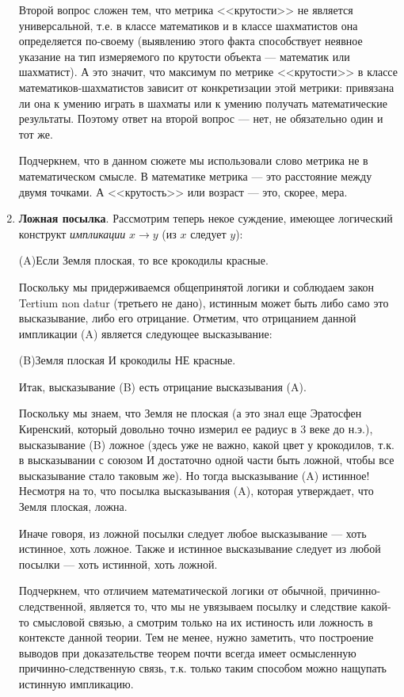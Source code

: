 \begin{enumerate}
Второй вопрос сложен тем, что метрика <<крутости>> не является универсальной, т.е. в классе математиков и в классе шахматистов она определяется по-своему (выявлению этого факта способствует неявное указание на тип измеряемого по крутости объекта --- математик или шахматист). А это значит, что максимум по метрике <<крутости>> в классе математиков-шахматистов зависит от конкретизации этой метрики: привязана ли она к умению играть в шахматы или к умению получать математические результаты. Поэтому ответ на второй вопрос --- нет, не обязательно один и тот же.

Подчеркнем, что в данном сюжете мы использовали слово метрика не в математическом смысле. В математике метрика --- это расстояние между двумя точками. А <<крутость>> или возраст --- это, скорее, мера.

\item \textbf{Ложная посылка}. Рассмотрим теперь некое суждение, имеющее логический конструкт \textit{импликации} $x\to y$ (из $x$ следует $y$):
\begin{center}
(A)\quad Если Земля плоская, то все крокодилы красные.
\end{center}
Поскольку мы придерживаемся общепринятой логики и соблюдаем закон Tertium non datur (третьего не дано), истинным может быть либо само это высказывание, либо его отрицание. Отметим, что отрицанием данной импликации (A) является следующее высказывание:
\begin{center}
(B)\quad Земля плоская И крокодилы НЕ красные.
\end{center}
Итак, высказывание (B) есть отрицание высказывания (A).

Поскольку мы знаем, что Земля не плоская (а это знал еще Эратосфен Киренский, который довольно точно измерил ее радиус в 3 веке до н.э.), высказывание (B) ложное (здесь уже не важно, какой цвет у крокодилов, т.к. в высказывании с союзом И достаточно одной части быть ложной, чтобы все высказывание стало таковым же). Но тогда высказывание (A) истинное!
Несмотря на то, что посылка высказывания (A), которая утверждает, что Земля плоская, ложна.

Иначе говоря, из ложной посылки следует любое высказывание --- хоть истинное, хоть ложное. Также и истинное высказывание следует из любой посылки --- хоть истинной, хоть ложной.

Подчеркнем, что отличием математической логики от обычной, причинно-следственной, является то, что мы не увязываем посылку и следствие какой-то смысловой связью, а смотрим только на их истиность или ложность в контексте данной теории. Тем не менее, нужно заметить, что построение выводов при доказательстве теорем почти всегда имеет осмысленную причинно-следственную связь, т.к. только таким способом можно нащупать истинную импликацию.


\end{enumerate}
